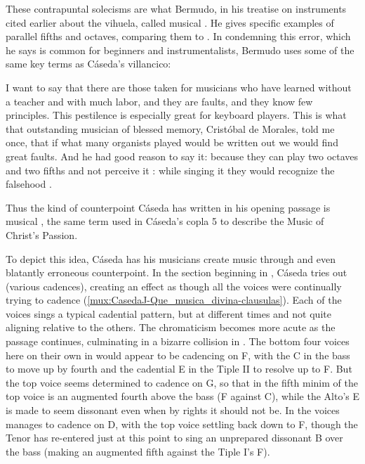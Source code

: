 
These contrapuntal solecisms are what Bermudo, in his treatise on instruments
cited earlier about the vihuela, called musical .
He gives specific examples of parallel fifths and octaves, comparing them to
.
In condemning this error, which he says is common for beginners and
instrumentalists, Bermudo uses some of the same key terms as Cáseda's
villancico:
\begin{quoting}
    I want to say that there are those taken for musicians who have learned
    without a teacher and with much labor, and they are faults, and they know
    few principles.
    This pestilence is especially great for keyboard players.  
    This is what that outstanding musician of blessed memory, Cristóbal de
    Morales, told me once, that if what many organists played would be written
    out we would find great faults.  
    And he had good reason to say it: because they can play two octaves and two
    fifths and not perceive it : while
    singing it they would recognize the falsehood .%
        \Autocite[]{Bermudo:Declaracion} 
\end{quoting}
Thus the kind of counterpoint Cáseda has written in his opening passage is
musical , the same term used in Cáseda's copla 5 to describe
the Music of Christ's Passion.

To depict this idea, Cáseda has his musicians create  music
through  and even blatantly erroneous counterpoint.
In the section beginning in , Cáseda tries out  (various cadences), creating an effect as though all the voices were
continually trying to cadence (\cref{mux:CasedaJ-Que_musica_divina-clausulas}).
Each of the voices sings a typical cadential pattern, but at different times
and not quite aligning relative to the others.
The chromaticism becomes more acute as the passage continues, culminating in a
bizarre collision in .
The bottom four voices here on their own in  would appear to be
cadencing on F, with the C in the bass to move up by fourth and the cadential E
in the Tiple II to resolve up to F.
But the top voice seems determined to cadence on G, so that in the fifth minim
of  the top voice is an augmented fourth above the bass (F\sh{}
against C), while the Alto's E is made to seem dissonant even when by rights it
should not be.
In  the voices manages to cadence on D, with the top voice settling
back down to F\sh, though the Tenor has re-entered just at this point to sing
an unprepared dissonant B\fl{} over the bass (making an augmented fifth against
the Tiple I's F\sh).


